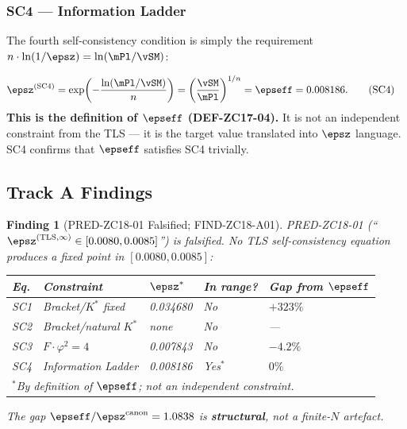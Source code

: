 \documentclass[12pt, a4paper]{article}
\newtheorem{finding}{Finding}[section]
\begin{document}
\subsubsection{SC4 — Information Ladder}

The fourth self-consistency condition is simply the requirement
$n\cdot\ln(1/\epsz) = \ln(\mPl/\vSM)$:

\begin{derivedbox}[title={SC4: Information Ladder Fixed Point}]
\begin{align}
  \epsz^{(\mathrm{SC4})}
  &= \exp\!\left(-\frac{\ln(\mPl/\vSM)}{n}\right)
  = \left(\frac{\vSM}{\mPl}\right)^{1/n}
  = \epseff = 0.008186.
  \tag{SC4}
\end{align}
\textbf{This is the definition of $\epseff$ (DEF-ZC17-04).}
It is not an independent constraint from the TLS — it is the
target value translated into $\epsz$ language.
SC4 confirms that $\epseff$ satisfies SC4 trivially.
\end{derivedbox}

\subsection{Track A Findings}
\label{zc18a:sec:findings}

\begin{finding}[PRED-ZC18-01 Falsified; FIND-ZC18-A01]
\label{zc18a:find:pred-falsified}
PRED-ZC18-01 (``$\epsz^{(\mathrm{TLS},\infty)}\in[0.0080,0.0085]$'')
is falsified.
No TLS self-consistency equation produces a fixed point in
$[0.0080,0.0085]$:
{\small
\renewcommand{\arraystretch}{1.30}
\begin{center}
\begin{tabular}{lllll}
\toprule
\textbf{Eq.} & \textbf{Constraint} & \textbf{$\epsz^*$} &
\textbf{In range?} & \textbf{Gap from $\epseff$}\\
\midrule
SC1 & Bracket/$K^*$ fixed   & 0.034680 & No & $+323\%$\\
SC2 & Bracket/natural $K^*$ & none     & No & ---\\
SC3 & $F\cdot\varphi^2 = 4$ & 0.007843 & No & $-4.2\%$\\
SC4 & Information Ladder    & 0.008186 & Yes$^*$ & $0\%$\\
\midrule
\multicolumn{5}{l}{$^*$By definition of $\epseff$; not an independent constraint.}\\
\bottomrule
\end{tabular}
\end{center}
}
The gap $\epseff/\epsz^{\rm canon} = 1.0838$ is \textbf{structural},
not a finite-$N$ artefact.
\end{finding}
\end{document}
